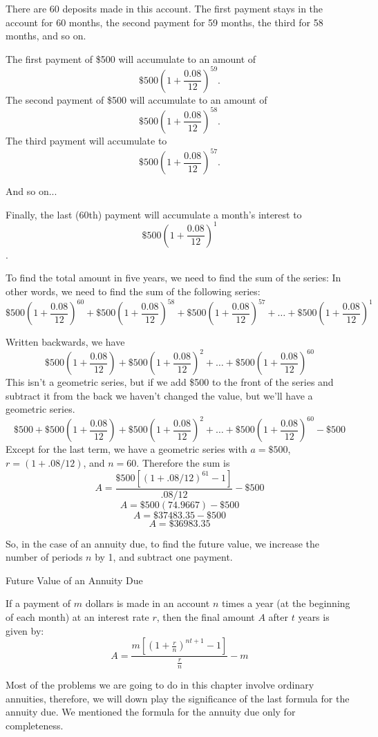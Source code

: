 \begin{solution}
    There are 60 deposits made in this account. The first payment stays in the account for 60 months, the second payment for 59 months, the third for 58 months, and so on.

    The first payment of \$500 will accumulate to an amount of
    \[
        \$500\left(1 + \frac{0.08}{12}\right)^{59}.
    \]
    The second payment of \$500 will accumulate to an amount of
    \[
        \$500\left(1 + \frac{0.08}{12}\right)^{58}.
    \]
    The third payment will accumulate to
    \[
        \$500\left(1 + \frac{0.08}{12}\right)^{57}.
    \]

    And so on...

    Finally, the last (60th) payment will accumulate a month's interest to
    \[
        \$500\left(1 + \frac{0.08}{12}\right)^{1}
    \].

    To find the total amount in five years, we need to find the sum of the series:
    In other words, we need to find the sum of the following series:
    \[
        \$500\left(1 + \frac{0.08}{12}\right)^{60} + \$500\left(1 + \frac{0.08}{12}\right)^{58} + \$500\left(1 + \frac{0.08}{12}\right)^{57} + \ldots + \$500\left(1 + \frac{0.08}{12}\right)^{1}
    \]

    Written backwards, we have
    \[
        \$500\left(1 + \frac{0.08}{12}\right) + \$500\left(1 + \frac{0.08}{12}\right)^2 + \ldots + \$500\left(1 + \frac{0.08}{12}\right)^{60}
    \]
    This isn't a geometric series, but if we add \$500 to the front of the series and subtract it from the back we haven't changed the value, but we'll have a geometric series.
    \[
        \$500 + \$500\left(1 + \frac{0.08}{12}\right) + \$500\left(1 + \frac{0.08}{12}\right)^2 + \ldots + \$500\left(1 + \frac{0.08}{12}\right)^{60} - \$500
    \]
    Except for the last term, we have a geometric series with \( a = \$500 \), \( r = (1 + .08/12) \), and \( n = 60 \). Therefore the sum is
    \[
        A = \frac{\$500[(1 + .08/12)^{61} - 1]}{.08/12} - \$500
    \]
    \[
        A = \$500(74.9667) - \$500
    \]
    \[
        A = \$37483.35 - \$500
    \]
    \[
        A = \$36983.35
    \]
\end{solution}

So, in the case of an annuity due, to find the future value, we increase the number of periods $n$ by 1, and subtract one payment.

\begin{summarybox}{Future Value of an Annuity Due}

    If a payment of $m$ dollars is made in an account $n$ times a year (at the beginning of each month) at an interest rate $r$, then the final amount $A$ after $t$ years is given by:
    \[
        A = \frac{m \left[ \left(1 + \frac{r}{n}\right)^{nt+1} - 1 \right]}{\frac{r}{n}}-m
    \]
\end{summarybox}

Most of the problems we are going to do in this chapter involve ordinary annuities, therefore, we will down play the significance of the last formula for the annuity due.  We mentioned the formula for the annuity due only for completeness.

